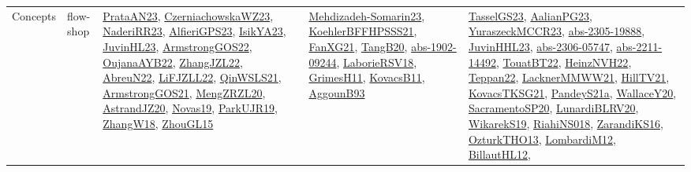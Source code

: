 {\begin{longtable}{lp{3cm}>{\raggedright}p{6cm}>{\raggedright}p{6cm}p{8cm}}
Concepts & flow-shop & \href{articles/PrataAN23.pdf}{PrataAN23}\cite{PrataAN23}, \href{articles/CzerniachowskaWZ23.pdf}{CzerniachowskaWZ23}\cite{CzerniachowskaWZ23}, \href{articles/NaderiRR23.pdf}{NaderiRR23}\cite{NaderiRR23}, \href{articles/AlfieriGPS23.pdf}{AlfieriGPS23}\cite{AlfieriGPS23}, \href{articles/IsikYA23.pdf}{IsikYA23}\cite{IsikYA23}, \href{papers/JuvinHL23.pdf}{JuvinHL23}\cite{JuvinHL23}, \href{papers/ArmstrongGOS22.pdf}{ArmstrongGOS22}\cite{ArmstrongGOS22}, \href{papers/OujanaAYB22.pdf}{OujanaAYB22}\cite{OujanaAYB22}, \href{papers/ZhangJZL22.pdf}{ZhangJZL22}\cite{ZhangJZL22}, \href{articles/AbreuN22.pdf}{AbreuN22}\cite{AbreuN22}, \href{papers/LiFJZLL22.pdf}{LiFJZLL22}\cite{LiFJZLL22}, \href{articles/QinWSLS21.pdf}{QinWSLS21}\cite{QinWSLS21}, \href{papers/ArmstrongGOS21.pdf}{ArmstrongGOS21}\cite{ArmstrongGOS21}, \href{articles/MengZRZL20.pdf}{MengZRZL20}\cite{MengZRZL20}, \href{articles/AstrandJZ20.pdf}{AstrandJZ20}\cite{AstrandJZ20}, \href{articles/Novas19.pdf}{Novas19}\cite{Novas19}, \href{papers/ParkUJR19.pdf}{ParkUJR19}\cite{ParkUJR19}, \href{articles/ZhangW18.pdf}{ZhangW18}\cite{ZhangW18}, \href{papers/ZhouGL15.pdf}{ZhouGL15}\cite{ZhouGL15} & \href{papers/Mehdizadeh-Somarin23.pdf}{Mehdizadeh-Somarin23}\cite{Mehdizadeh-Somarin23}, \href{articles/KoehlerBFFHPSSS21.pdf}{KoehlerBFFHPSSS21}\cite{KoehlerBFFHPSSS21}, \href{articles/FanXG21.pdf}{FanXG21}\cite{FanXG21}, \href{papers/TangB20.pdf}{TangB20}\cite{TangB20}, \href{articles/abs-1902-09244.pdf}{abs-1902-09244}\cite{abs-1902-09244}, \href{articles/LaborieRSV18.pdf}{LaborieRSV18}\cite{LaborieRSV18}, \href{papers/GrimesH11.pdf}{GrimesH11}\cite{GrimesH11}, \href{articles/KovacsB11.pdf}{KovacsB11}\cite{KovacsB11}, \href{articles/AggounB93.pdf}{AggounB93}\cite{AggounB93} & \href{papers/TasselGS23.pdf}{TasselGS23}\cite{TasselGS23}, \href{papers/AalianPG23.pdf}{AalianPG23}\cite{AalianPG23}, \href{articles/YuraszeckMCCR23.pdf}{YuraszeckMCCR23}\cite{YuraszeckMCCR23}, \href{articles/abs-2305-19888.pdf}{abs-2305-19888}\cite{abs-2305-19888}, \href{papers/JuvinHHL23.pdf}{JuvinHHL23}\cite{JuvinHHL23}, \href{articles/abs-2306-05747.pdf}{abs-2306-05747}\cite{abs-2306-05747}, \href{articles/abs-2211-14492.pdf}{abs-2211-14492}\cite{abs-2211-14492}, \href{papers/TouatBT22.pdf}{TouatBT22}\cite{TouatBT22}, \href{articles/HeinzNVH22.pdf}{HeinzNVH22}\cite{HeinzNVH22}, \href{papers/Teppan22.pdf}{Teppan22}\cite{Teppan22}, \href{papers/LacknerMMWW21.pdf}{LacknerMMWW21}\cite{LacknerMMWW21}, \href{papers/HillTV21.pdf}{HillTV21}\cite{HillTV21}, \href{papers/KovacsTKSG21.pdf}{KovacsTKSG21}\cite{KovacsTKSG21}, \href{articles/PandeyS21a.pdf}{PandeyS21a}\cite{PandeyS21a}, \href{articles/WallaceY20.pdf}{WallaceY20}\cite{WallaceY20}, \href{articles/SacramentoSP20.pdf}{SacramentoSP20}\cite{SacramentoSP20}, \href{articles/LunardiBLRV20.pdf}{LunardiBLRV20}\cite{LunardiBLRV20}, \href{articles/WikarekS19.pdf}{WikarekS19}\cite{WikarekS19}, \href{papers/RiahiNS018.pdf}{RiahiNS018}\cite{RiahiNS018}, \href{articles/ZarandiKS16.pdf}{ZarandiKS16}\cite{ZarandiKS16}, \href{articles/OzturkTHO13.pdf}{OzturkTHO13}\cite{OzturkTHO13}, \href{articles/LombardiM12.pdf}{LombardiM12}\cite{LombardiM12}, \href{papers/BillautHL12.pdf}{BillautHL12}\cite{BillautHL12}, 
\end{longtable}}
